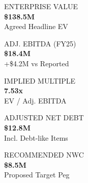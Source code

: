 \documentclass[10pt,a4paper,oneside]{scrreprt}
\begin{document}
\noindent
\begin{minipage}[t]{0.19\textwidth}
  \begin{tcolorbox}[metricbox]
    \centering
    \textcolor{MutedGray}{\fontsize{5.8}{7.2}\selectfont ENTERPRISE VALUE}\\[2pt]
    {\fontsize{10.5}{12.5}\selectfont\textbf{\$138.5M}}\\[2pt]
    \textcolor{TealAccent}{\fontsize{5.8}{7.2}\selectfont Agreed Headline EV}
  \end{tcolorbox}
\end{minipage}\hfill
\begin{minipage}[t]{0.19\textwidth}
  \begin{tcolorbox}[metricbox]
    \centering
    \textcolor{MutedGray}{\fontsize{5.8}{7.2}\selectfont ADJ. EBITDA (FY25)}\\[2pt]
    {\fontsize{10.5}{12.5}\selectfont\textbf{\$18.4M}}\\[2pt]
    \textcolor{SoftGreen}{\fontsize{5.8}{7.2}\selectfont +\$4.2M vs Reported}
  \end{tcolorbox}
\end{minipage}\hfill
\begin{minipage}[t]{0.19\textwidth}
  \begin{tcolorbox}[metricbox]
    \centering
    \textcolor{MutedGray}{\fontsize{5.8}{7.2}\selectfont IMPLIED MULTIPLE}\\[2pt]
    {\fontsize{10.5}{12.5}\selectfont\textbf{7.53x}}\\[2pt]
    \textcolor{Charcoal}{\fontsize{5.8}{7.2}\selectfont EV / Adj. EBITDA}
  \end{tcolorbox}
\end{minipage}\hfill
\begin{minipage}[t]{0.19\textwidth}
  \begin{tcolorbox}[metricbox]
    \centering
    \textcolor{MutedGray}{\fontsize{5.8}{7.2}\selectfont ADJUSTED NET DEBT}\\[2pt]
    {\fontsize{10.5}{12.5}\selectfont\textbf{\$12.8M}}\\[2pt]
    \textcolor{SoftRed}{\fontsize{5.8}{7.2}\selectfont Incl. Debt-like Items}
  \end{tcolorbox}
\end{minipage}\hfill
\begin{minipage}[t]{0.19\textwidth}
  \begin{tcolorbox}[metricbox]
    \centering
    \textcolor{MutedGray}{\fontsize{5.8}{7.2}\selectfont RECOMMENDED NWC}\\[2pt]
    {\fontsize{10.5}{12.5}\selectfont\textbf{\$8.5M}}\\[2pt]
    \textcolor{WarmAmber}{\fontsize{5.8}{7.2}\selectfont Proposed Target Peg}
  \end{tcolorbox}
\end{minipage}
\end{document}
